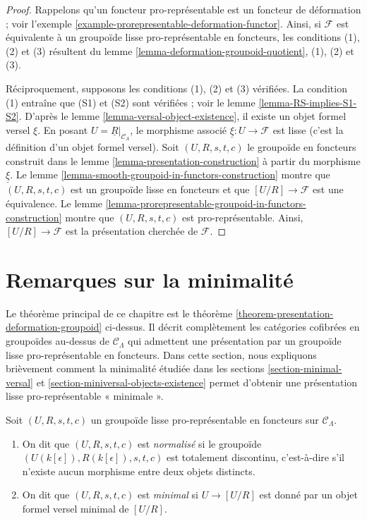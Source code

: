 \begin{proof}
Rappelons qu'un foncteur pro-représentable est un foncteur de déformation ;
voir l'exemple \ref{example-prorepresentable-deformation-functor}. Ainsi, si
$\mathcal{F}$ est équivalente à un groupoïde lisse pro-représentable en
foncteurs, les conditions (1), (2) et (3) résultent du lemme
\ref{lemma-deformation-groupoid-quotient}, (1), (2) et (3).

\medskip\noindent
Réciproquement, supposons les conditions (1), (2) et (3) vérifiées. La
condition (1) entraîne que (S1) et (S2) sont vérifiées ; voir le lemme
\ref{lemma-RS-implies-S1-S2}. D'après le lemme
\ref{lemma-versal-object-existence}, il existe un objet formel versel $\xi$.
En posant $U = \underline{R}|_{\mathcal{C}_\Lambda}$, le morphisme associé
$\underline{\xi} : U \to \mathcal{F}$ est lisse (c'est la définition d'un
objet formel versel). Soit $(U, R, s, t, c)$ le groupoïde en foncteurs construit
dans le lemme \ref{lemma-presentation-construction} à partir du morphisme
$\underline{\xi}$. Le lemme
\ref{lemma-smooth-groupoid-in-functors-construction} montre que
$(U, R, s, t, c)$ est un groupoïde lisse en foncteurs et que
$[U/R] \to \mathcal{F}$ est une équivalence. Le lemme
\ref{lemma-prorepresentable-groupoid-in-functors-construction} montre que
$(U, R, s, t, c)$ est pro-représentable. Ainsi,
$[U/R] \to \mathcal{F}$ est la présentation cherchée de $\mathcal{F}$.
\end{proof}








\section{Remarques sur la minimalité}
\label{section-minimality}

\noindent
Le théorème principal de ce chapitre est le théorème
\ref{theorem-presentation-deformation-groupoid} ci-dessus. Il décrit
complètement les catégories cofibrées en groupoïdes au-dessus de
$\mathcal{C}_\Lambda$ qui admettent une présentation par un groupoïde lisse
pro-représentable en foncteurs. Dans cette section, nous expliquons brièvement
comment la minimalité étudiée dans les sections \ref{section-minimal-versal} et
\ref{section-miniversal-objects-existence} permet d'obtenir une présentation
lisse pro-représentable « minimale ».

\begin{definition}
\label{definition-minimal-groupoid-in-functors}
Soit $(U, R, s, t, c)$ un groupoïde lisse pro-représentable en foncteurs sur
$\mathcal{C}_\Lambda$.
\begin{enumerate}
\item On dit que $(U, R, s, t, c)$ est {\it normalisé} si le groupoïde
$(U(k[\epsilon]), R(k[\epsilon]), s, t, c)$ est totalement discontinu,
c'est-à-dire s'il n'existe aucun morphisme entre deux objets distincts.
\item On dit que $(U, R, s, t, c)$ est {\it minimal} si $U \to [U/R]$ est
donné par un objet formel versel minimal de $[U/R]$.
\end{enumerate}
\end{definition}

